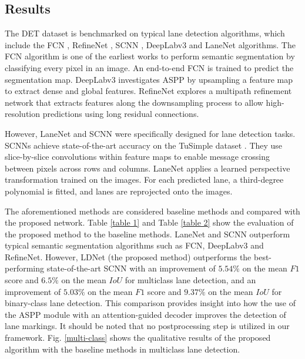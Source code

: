 \documentclass[journal]{IEEEtran}
\begin{document}
\subsection{Results}
The DET dataset is benchmarked on typical lane detection algorithms, which include the FCN \cite{Long2015}, RefineNet \cite{Lin2017}, SCNN \cite{Pan2017}, DeepLabv3 \cite{a4} and LaneNet \cite{Wang2018} algorithms. The FCN algorithm is one of the earliest works to perform semantic segmentation by classifying every pixel in an image. An end-to-end FCN is trained to predict the segmentation map. DeepLabv3 investigates ASPP by upsampling a feature map to extract dense and global features. RefineNet explores a multipath refinement network that extracts features along the downsampling process to allow high-resolution predictions using long residual connections.
\par
However, LaneNet and SCNN were specifically designed for lane detection tasks. SCNNs achieve state-of-the-art accuracy on the TuSimple dataset \cite{tusimple}. They use slice-by-slice convolutions within feature maps to enable message crossing between pixels across rows and columns. LaneNet applies a learned perspective transformation trained on the images. For each predicted lane, a third-degree polynomial is fitted, and lanes are reprojected onto the images.
\par 
The aforementioned methods are considered baseline methods and compared with the proposed network. Table \ref{table 1} and Table \ref{table 2} show the evaluation of the proposed method to the baseline methods. LaneNet and SCNN outperform typical semantic segmentation algorithms such as FCN, DeepLabv3 and RefineNet. However, LDNet (the proposed method) outperforms the best-performing state-of-the-art SCNN with an improvement of $5.54 \%$ on the mean $F1$ score and $6.5\%$ on the mean $IoU$ for multiclass lane detection, and an improvement of $5.03 \%$ on the mean $F1$ score and $9.37\%$ on the mean $IoU$ for binary-class lane detection. This comparison provides insight into how the use of the ASPP module with an attention-guided decoder improves the detection of lane markings. It should be noted that no postprocessing step is utilized in our framework. Fig. \ref{multi-class} shows the qualitative results of the proposed algorithm with the baseline methods in multiclass lane detection.
\par 
\end{document}

